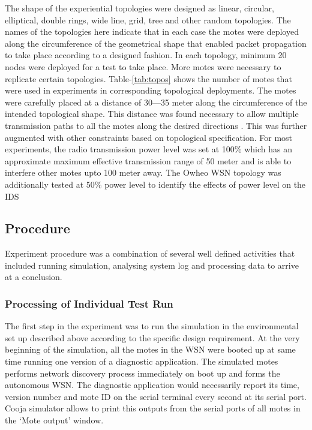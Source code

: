 \documentclass[conference,final]{IEEEtran}
\begin{document}
The shape of the experiential topologies were designed as linear, circular, elliptical, double rings, wide line, grid, tree and other random topologies.
The names of the topologies here indicate that in each case the motes were deployed along the circumference of the geometrical shape that enabled packet propagation to take place according to a designed fashion.
In each topology, minimum 20 nodes were deployed for a test to take place. 
More motes were necessary to replicate certain topologies.
Table-\ref{tab:topos} shows the number of motes that were used in experiments in corresponding topological  deployments.
The motes were carefully placed at a distance of 30---35 meter along the circumference of the intended topological shape. 
This distance was found necessary to allow  multiple transmission paths to all the motes along the desired directions . 
This was further augmented with other constraints based on topological specification.
For most experiments, the radio transmission power level was set at 100\% which has an approximate maximum effective transmission range of 50 meter and is able to interfere other motes upto 100 meter away.
The Owheo WSN topology was additionally tested at 50\%  power level to identify the effects of power level on the IDS



\subsection*{Procedure}
\label{subsec:proc}

Experiment procedure  was a combination of several well defined activities  that included running simulation, analysing system log and processing data to arrive at a conclusion. 


\subsubsection*{Processing  of Individual Test Run}
\label{ssc:test_runs}
The first step in the experiment was to run the simulation in the environmental set up described above according to the specific design requirement. 
At the very beginning of the simulation, all the motes in the WSN were booted up at same time running one version of a diagnostic application. 
The simulated motes performs network discovery process immediately on boot up and forms the autonomous WSN.
The diagnostic application would necessarily report its time, version number and mote ID on the serial terminal every second at its serial port. 
Cooja simulator allows to print this outputs from the serial ports of all motes in the `Mote output' window.
\end{document}
